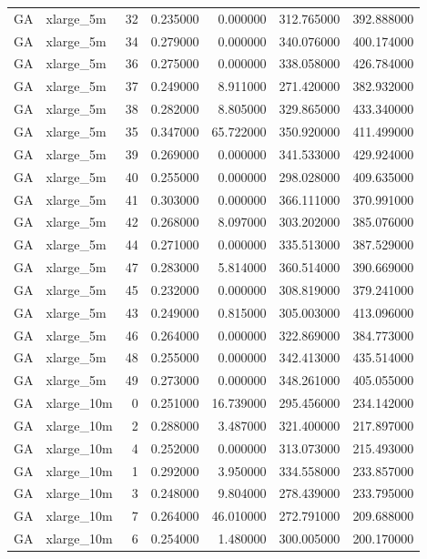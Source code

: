 \begin{tabular}{llrrrrr}
GA & xlarge_5m & 32 & 0.235000 & 0.000000 & 312.765000 & 392.888000 \\
GA & xlarge_5m & 34 & 0.279000 & 0.000000 & 340.076000 & 400.174000 \\
GA & xlarge_5m & 36 & 0.275000 & 0.000000 & 338.058000 & 426.784000 \\
GA & xlarge_5m & 37 & 0.249000 & 8.911000 & 271.420000 & 382.932000 \\
GA & xlarge_5m & 38 & 0.282000 & 8.805000 & 329.865000 & 433.340000 \\
GA & xlarge_5m & 35 & 0.347000 & 65.722000 & 350.920000 & 411.499000 \\
GA & xlarge_5m & 39 & 0.269000 & 0.000000 & 341.533000 & 429.924000 \\
GA & xlarge_5m & 40 & 0.255000 & 0.000000 & 298.028000 & 409.635000 \\
GA & xlarge_5m & 41 & 0.303000 & 0.000000 & 366.111000 & 370.991000 \\
GA & xlarge_5m & 42 & 0.268000 & 8.097000 & 303.202000 & 385.076000 \\
GA & xlarge_5m & 44 & 0.271000 & 0.000000 & 335.513000 & 387.529000 \\
GA & xlarge_5m & 47 & 0.283000 & 5.814000 & 360.514000 & 390.669000 \\
GA & xlarge_5m & 45 & 0.232000 & 0.000000 & 308.819000 & 379.241000 \\
GA & xlarge_5m & 43 & 0.249000 & 0.815000 & 305.003000 & 413.096000 \\
GA & xlarge_5m & 46 & 0.264000 & 0.000000 & 322.869000 & 384.773000 \\
GA & xlarge_5m & 48 & 0.255000 & 0.000000 & 342.413000 & 435.514000 \\
GA & xlarge_5m & 49 & 0.273000 & 0.000000 & 348.261000 & 405.055000 \\
GA & xlarge_10m & 0 & 0.251000 & 16.739000 & 295.456000 & 234.142000 \\
GA & xlarge_10m & 2 & 0.288000 & 3.487000 & 321.400000 & 217.897000 \\
GA & xlarge_10m & 4 & 0.252000 & 0.000000 & 313.073000 & 215.493000 \\
GA & xlarge_10m & 1 & 0.292000 & 3.950000 & 334.558000 & 233.857000 \\
GA & xlarge_10m & 3 & 0.248000 & 9.804000 & 278.439000 & 233.795000 \\
GA & xlarge_10m & 7 & 0.264000 & 46.010000 & 272.791000 & 209.688000 \\
GA & xlarge_10m & 6 & 0.254000 & 1.480000 & 300.005000 & 200.170000 \\

\end{tabular}
